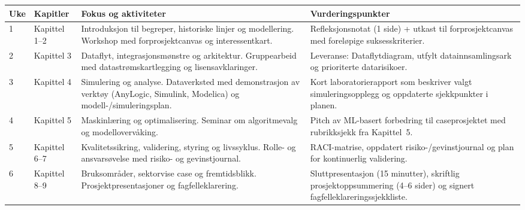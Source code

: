 \begin{tabular}{p{1.3cm}p{4cm}p{5.2cm}p{4cm}}
\toprule
\textbf{Uke} & \textbf{Kapitler} & \textbf{Fokus og aktiviteter} & \textbf{Vurderingspunkter} \\
\midrule
1 & Kapittel 1--2 & Introduksjon til begreper, historiske linjer og modellering. Workshop med forprosjektcanvas og interessentkart. & Refleksjonsnotat (1 side) + utkast til forprosjektcanvas med foreløpige suksesskriterier. \\
2 & Kapittel 3 & Dataflyt, integrasjonsmønstre og arkitektur. Gruppearbeid med datastrømskartlegging og lisensavklaringer. & Leveranse: Dataflytdiagram, utfylt datainnsamlingsark og prioriterte datarisikoer. \\
3 & Kapittel 4 & Simulering og analyse. Dataverksted med demonstrasjon av verktøy (AnyLogic, Simulink, Modelica) og modell-/simuleringsplan. & Kort laboratorierapport som beskriver valgt simuleringsopplegg og oppdaterte sjekkpunkter i planen. \\
4 & Kapittel 5 & Maskinlæring og optimalisering. Seminar om algoritmevalg og modellovervåking. & Pitch av ML-basert forbedring til caseprosjektet med rubrikksjekk fra Kapittel~5. \\
5 & Kapittel 6--7 & Kvalitetssikring, validering, styring og livssyklus. Rolle- og ansvarsøvelse med risiko- og gevinstjournal. & RACI-matrise, oppdatert risiko-/gevinstjournal og plan for kontinuerlig validering. \\
6 & Kapittel 8--9 & Bruksområder, sektorvise case og fremtidsblikk. Prosjektpresentasjoner og fagfelleklarering. & Sluttpresentasjon (15 minutter), skriftlig prosjektoppsummering (4--6 sider) og signert fagfelleklareringssjekkliste. \\
\bottomrule
\end{tabular}

